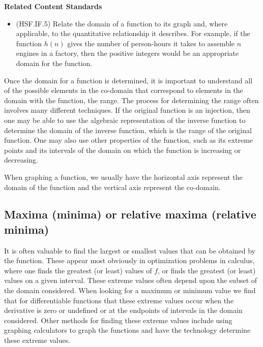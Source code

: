 \documentclass[
]{book}
\providecommand{\tightlist}{%
  \setlength{\itemsep}{0pt}\setlength{\parskip}{0pt}}
\newenvironment{standards}{}{}
\theoremstyle{definition}
\theoremstyle{definition}
\theoremstyle{definition}
\theoremstyle{definition}
\theoremstyle{remark}
\begin{document}
\begin{standards}

\begin{center}
\textbf{Related Content Standards}

\end{center}

\begin{itemize}
\tightlist
\item
  (HSF.IF.5) Relate the domain of a function to its graph and, where applicable, to the quantitative relationship it describes. For example, if the function \(h(n)\) gives the number of person-hours it takes to assemble \(n\) engines in a factory, then the positive integers would be an appropriate domain for the function.\\
\end{itemize}

\end{standards}

Once the domain for a function is determined, it is important to understand all of the possible elements in the co-domain that correspond to elements in the domain with the function, the range. The process for determining the range often involves many different techniques. If the original function is an injection, then one may be able to use the algebraic representation of the inverse function to determine the domain of the inverse function, which is the range of the original function. One may also use other properties of the function, such as its extreme points and its intervals of the domain on which the function is increasing or decreasing.

When graphing a function, we usually have the horizontal axis represent the domain of the function and the vertical axis represent the co-domain.

\hypertarget{maxima-minima-or-relative-maxima-relative-minima}{%
\subsection{Maxima (minima) or relative maxima (relative minima)}\label{maxima-minima-or-relative-maxima-relative-minima}}

It is often valuable to find the largest or smallest values that can be obtained by the function. These appear most obviously in optimization problems in calculus, where one finds the greatest (or least) values of \(f\), or finds the greatest (or least) values on a given interval. These extreme values often depend upon the subset of the domain considered. When looking for a maximum or minimum value we find that for differentiable functions that these extreme values occur when the derivative is zero or undefined or at the endpoints of intervals in the domain considered. Other methods for finding these extreme values include using graphing calculators to graph the functions and have the technology determine these extreme values.
\end{document}
